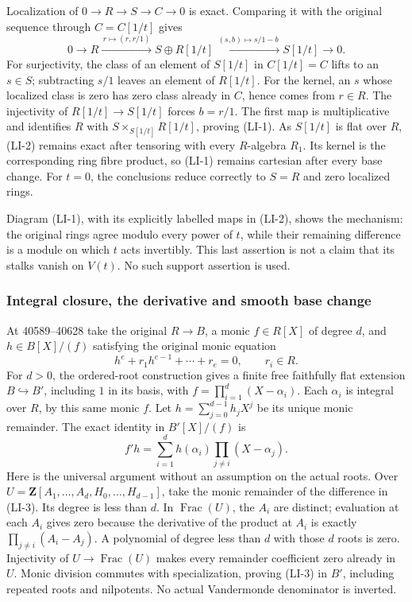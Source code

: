 Localization of \(0\to R\to S\to C\to0\) is exact. Comparing it with the original sequence through \(C=C[1/t]\) gives \[
0\longrightarrow R
\xrightarrow{\,r\mapsto(r,r/1)\,} S\oplus R[1/t]
\xrightarrow{\,(s,b)\mapsto s/1-b\,}S[1/t]
\longrightarrow0.
\tag{LI-2}
\] For surjectivity, the class of an element of \(S[1/t]\) in \(C[1/t]=C\) lifts to an \(s\in S\); subtracting \(s/1\) leaves an element of \(R[1/t]\). For the kernel, an \(s\) whose localized class is zero has zero class already in \(C\), hence comes from \(r\in R\). The injectivity of \(R[1/t]\to S[1/t]\) forces \(b=r/1\). The first map is multiplicative and identifies \(R\) with \(S\times_{S[1/t]}R[1/t]\), proving (LI-1). As \(S[1/t]\) is flat over \(R\), (LI-2) remains exact after tensoring with every \(R\)-algebra \(R_1\). Its kernel is the corresponding ring fibre product, so (LI-1) remains cartesian after every base change. For \(t=0\), the conclusions reduce correctly to \(S=R\) and zero localized rings.

Diagram (LI-1), with its explicitly labelled maps in (LI-2), shows the mechanism: the original rings agree modulo every power of \(t\), while their remaining difference is a module on which \(t\) acts invertibly. This last assertion is not a claim that its stalks vanish on \(V(t)\). No such support assertion is used.

\subsubsection{Integral closure, the derivative and smooth base change}\label{integral-closure-the-derivative-and-smooth-base-change}

At 40589--40628 take the original \(R\to B\), a monic \(f\in R[X]\) of degree \(d\), and \(h\in B[X]/(f)\) satisfying the original monic equation \[
h^e+r_1h^{e-1}+\cdots+r_e=0,\qquad r_i\in R.
\] For \(d>0\), the ordered-root construction gives a finite free faithfully flat extension \(B\hookrightarrow B'\), including \(1\) in its basis, with \(f=\prod_{i=1}^d(X-\alpha_i)\). Each \(\alpha_i\) is integral over \(R\), by this same monic \(f\). Let \(h=\sum_{j=0}^{d-1}h_jX^j\) be its unique monic remainder. The exact identity in \(B'[X]/(f)\) is \[
f'h=\sum_{i=1}^d h(\alpha_i)\prod_{j\ne i}(X-\alpha_j).
\tag{LI-3}
\] Here is the universal argument without an assumption on the actual roots. Over \(U=\mathbf Z[A_1,\ldots,A_d,H_0,\ldots,H_{d-1}]\), take the monic remainder of the difference in (LI-3). Its degree is less than \(d\). In \(\operatorname{Frac}(U)\), the \(A_i\) are distinct; evaluation at each \(A_i\) gives zero because the derivative of the product at \(A_i\) is exactly \(\prod_{j\ne i}(A_i-A_j)\). A polynomial of degree less than \(d\) with those \(d\) roots is zero. Injectivity of \(U\to\operatorname{Frac}(U)\) makes every remainder coefficient zero already in \(U\). Monic division commutes with specialization, proving (LI-3) in \(B'\), including repeated roots and nilpotents. No actual Vandermonde denominator is inverted.

